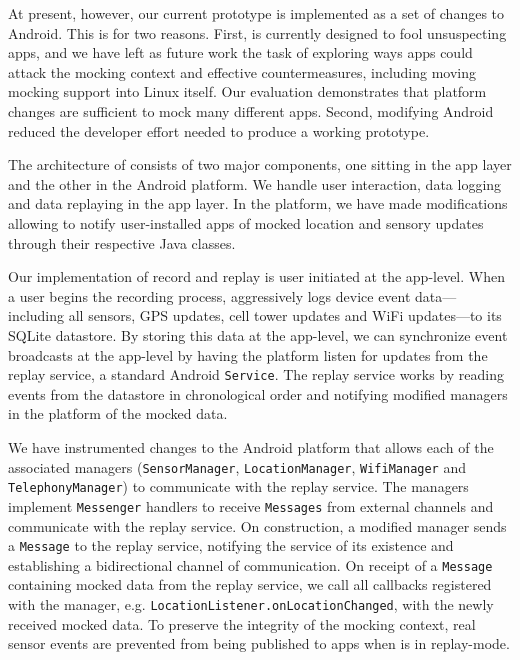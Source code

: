 At present, however, our current \PocketMocker{} prototype is implemented as
a set of changes to Android. This is for two reasons. First, \PocketMocker{}
is currently designed to fool unsuspecting apps, and we have left as future
work the task of exploring ways apps could attack the mocking context and
effective \PocketMocker{} countermeasures, including moving mocking support
into Linux itself. Our evaluation demonstrates that platform changes are
sufficient to mock many different apps. Second, modifying Android reduced the
developer effort needed to produce a working prototype.


The architecture of \PocketMocker{} consists of two major components, one
sitting in the app layer and the other in the Android platform. We handle user
interaction, data logging and data replaying in the app layer. In the platform,
we have made modifications allowing \PocketMocker{} to notify user-installed
apps of mocked location and sensory updates through their respective Java
classes.

Our implementation of record and replay is user initiated at the app-level.
When a user begins the recording process, \PocketMocker{} aggressively logs
device event data---including all sensors, GPS updates, cell tower updates and
WiFi updates---to its SQLite datastore. By storing this data at the app-level,
we can synchronize event broadcasts at the app-level by having the platform
listen for updates from the \PocketMocker{} replay service, a standard Android
\texttt{Service}. The replay service works by reading events from the datastore
in chronological order and notifying modified managers in the platform of the
mocked data.

We have instrumented changes to the Android platform that allows each of the
associated managers (\texttt{SensorManager}, \texttt{LocationManager},
\texttt{WifiManager} and \texttt{TelephonyManager}) to communicate with the
\PocketMocker{} replay service. The managers implement \texttt{Messenger}
handlers to receive \texttt{Messages} from external channels and communicate
with the replay service. On construction, a modified manager sends a
\texttt{Message} to the replay service, notifying the service of its existence
and establishing a bidirectional channel of communication. On receipt of a
\texttt{Message} containing mocked data from the replay service, we call all
callbacks registered with the manager, e.g.
\texttt{LocationListener.onLocationChanged}, with the newly received mocked
data. To preserve the integrity of the mocking context, real sensor events are
prevented from being published to apps when \PocketMocker{} is in replay-mode.
